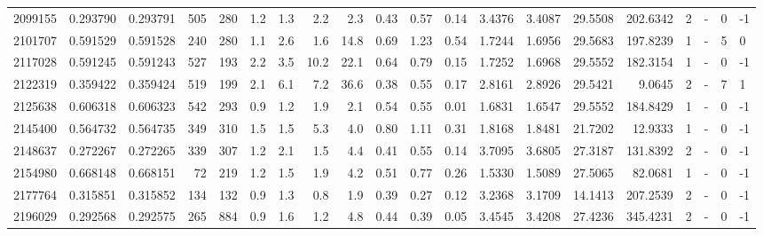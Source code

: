 \begin{tabular}{rrrrrrrrrrrrrrrrrlrl}
   2099155 & 0.293790 &   0.293791 &  505 &  280 &      1.2 &      1.3 &     2.2 &      2.3 &       0.43 &        0.57 &        0.14 &  3.4376 &  3.4087 &   29.5508 &  202.6342 &       2 &             - &        0 &        -1 \\
   2101707 & 0.591529 &   0.591528 &  240 &  280 &      1.1 &      2.6 &     1.6 &     14.8 &       0.69 &        1.23 &        0.54 &  1.7244 &  1.6956 &   29.5683 &  197.8239 &       1 &             - &        5 &         0 \\
   2117028 & 0.591245 &   0.591243 &  527 &  193 &      2.2 &      3.5 &    10.2 &     22.1 &       0.64 &        0.79 &        0.15 &  1.7252 &  1.6968 &   29.5552 &  182.3154 &       1 &             - &        0 &        -1 \\
   2122319 & 0.359422 &   0.359424 &  519 &  199 &      2.1 &      6.1 &     7.2 &     36.6 &       0.38 &        0.55 &        0.17 &  2.8161 &  2.8926 &   29.5421 &    9.0645 &       2 &             - &        7 &         1 \\
   2125638 & 0.606318 &   0.606323 &  542 &  293 &      0.9 &      1.2 &     1.9 &      2.1 &       0.54 &        0.55 &        0.01 &  1.6831 &  1.6547 &   29.5552 &  184.8429 &       1 &             - &        0 &        -1 \\
   2145400 & 0.564732 &   0.564735 &  349 &  310 &      1.5 &      1.5 &     5.3 &      4.0 &       0.80 &        1.11 &        0.31 &  1.8168 &  1.8481 &   21.7202 &   12.9333 &       1 &             - &        0 &        -1 \\
   2148637 & 0.272267 &   0.272265 &  339 &  307 &      1.2 &      2.1 &     1.5 &      4.4 &       0.41 &        0.55 &        0.14 &  3.7095 &  3.6805 &   27.3187 &  131.8392 &       2 &             - &        0 &        -1 \\
   2154980 & 0.668148 &   0.668151 &   72 &  219 &      1.2 &      1.5 &     1.9 &      4.2 &       0.51 &        0.77 &        0.26 &  1.5330 &  1.5089 &   27.5065 &   82.0681 &       1 &             - &        0 &        -1 \\
   2177764 & 0.315851 &   0.315852 &  134 &  132 &      0.9 &      1.3 &     0.8 &      1.9 &       0.39 &        0.27 &        0.12 &  3.2368 &  3.1709 &   14.1413 &  207.2539 &       2 &             - &        0 &        -1 \\
   2196029 & 0.292568 &   0.292575 &  265 &  884 &      0.9 &      1.6 &     1.2 &      4.8 &       0.44 &        0.39 &        0.05 &  3.4545 &  3.4208 &   27.4236 &  345.4231 &       2 &             - &        0 &        -1 \\

\end{tabular}

